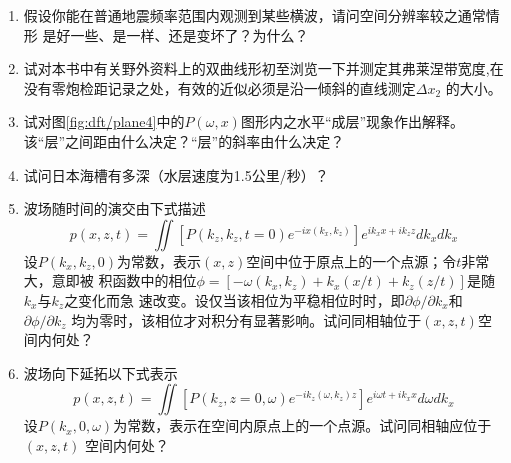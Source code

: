 \begin{enumerate}
\item
    假设你能在普通地震频率范围内观测到某些横波，请问空间分辨率较之通常情形
是好一些、是一样、还是变坏了？为什么？
\item
    试对本书中有关野外资料上的双曲线形初至浏览一下并测定其弗莱涅带宽度,在
没有零炮检距记录之处，有效的近似必须是沿一倾斜的直线测定${\Delta x_{2}}$
的大小。
\item
试对图\ref{fig:dft/plane4}中的$P(\omega,x)$图形内之水平“成层”现象作出解释。
该“层”之间距由什么决定？“层”的斜率由什么决定？
\item
试问日本海槽有多深（水层速度为1.5公里/秒）？
\item
    波场随时间的演交由下式描述
\begin{equation*}
p(x,z,t)=\iint[P(k_z,k_z,t=0)e^{-ix(k_x,k_z)}]e^{ik_xx+ik_zz}dk_xdk_x
\end{equation*}
设$P(k_x,k_z,0)$为常数，表示$(x,z)$空间中位于原点上的一个点源；令$t$非常大，意即被
积函数中的相位$\phi=[-\omega(k_x,k_z)+k_x(x/t)+k_z(z/t)]$是随$k_x$与$k_z$之变化而急
速改变。设仅当该相位为平稳相位时时，即$\partial\phi/\partial k_x$和$\partial\phi/\partial k_z$
均为零时，该相位才对积分有显著影响。试问同相轴位于$(x,z,t)$空间内何处？
\item 波场向下延拓以下式表示
\begin{equation*}
p(x,z,t)=\iint[P(k_z,z=0,\omega)e^{-ik_z(\omega,k_z)z}]e^{i\omega t+ik_xx}d\omega dk_x
\end{equation*}
设$P(k_x,0,\omega)$为常数，表示在空间内原点上的一个点源。试问同相轴应位于$(x,z,t)$
空间内何处？
\end{enumerate}
